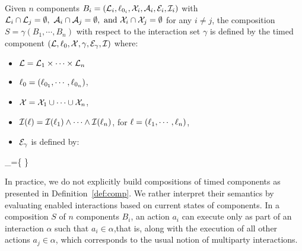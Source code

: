 \begin{definition}\label{def:comp}
  Given $n$ components $B_{i}=(\mathcal{L}_{i},\ell_{0_{i}},\mathcal{X}_{i},\mathcal{A}_{i},\mathcal{E}_{i},\mathcal{I}_{i})$ with $\mathcal{L}_i\cap\mathcal{L}_j=\emptyset, \ \mathcal{A}_i\cap
  \mathcal{A}_j=\emptyset,\text{ and }\mathcal{X}_i\cap\mathcal{X}_j=\emptyset$ for any $i\neq j$,
  the composition $S=\gamma(B_1,\cdots,B_n)$ with respect to the interaction set 
  $\gamma$ is defined by the timed component $(\mathcal{L},\ell_0,\mathcal{X},\gamma,
  \mathcal{E}_{\gamma},\mathcal{I})$ where:
  \begin{itemize}
    \item $\mathcal{L}=\mathcal{L}_1\times\cdots\times\mathcal{L}_n$
    \item $\ell_0=(\ell_{0_1},\cdots,\ell_{0_n})$,
    \item $\mathcal{X}=\mathcal{X}_1\cup\cdots\cup\mathcal{X}_n$,
    \item $\mathcal{I}(\ell)=\mathcal{I}(\ell_1)\wedge\cdots\wedge\mathcal{I}(\ell_n)$, for $\ell=
      (\ell_1,\cdots,\ell_n)$,
    \item $\mathcal{E}_{\gamma}$ is defined by:
  \end{itemize}
      \begin{myequation}
        _{\gamma}=\left\{
          \Big\lvert
         \right\} 
      \end{myequation}
      
\end{definition}

In practice, we do not explicitly build compositions of timed components as 
presented in Definition~\ref{def:comp}. We rather interpret their semantics by 
evaluating enabled interactions based on current states of components. In a 
composition $S$ of $n$ components $B_i$, an action $a_i$ can execute only as part
of an interaction $\alpha$ such that $a_i\in\alpha$,that is, along with the 
execution of all other actions $a_j\in\alpha$, which corresponds to the usual 
notion of multiparty interactions.

